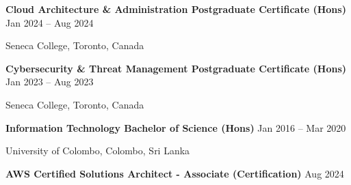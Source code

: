 \documentclass[10pt,letterpaper]{article}
\begin{document}
\vspace{1pt}

\textbf{Cloud Architecture \& Administration Postgraduate Certificate (Hons)} \hfill Jan 2024 -- Aug 2024

Seneca College, Toronto, Canada

\textbf{Cybersecurity \& Threat Management Postgraduate Certificate (Hons)} \hfill Jan 2023 -- Aug 2023

Seneca College, Toronto, Canada

\textbf{Information Technology Bachelor of Science (Hons)} \hfill Jan 2016 -- Mar 2020

University of Colombo, Colombo, Sri Lanka

\textbf{AWS Certified Solutions Architect - Associate (Certification)} \hfill Aug 2024
\end{document}
